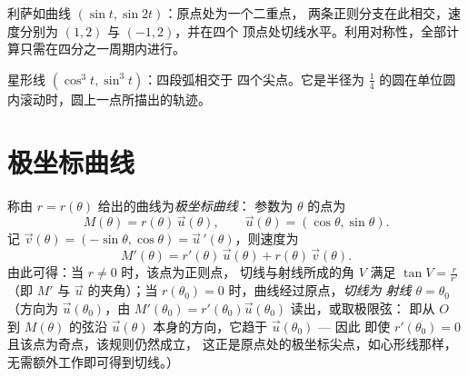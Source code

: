 \begin{omfigure}

{\small 利萨如曲线 $(\sin t, \sin 2t)$：原点处为一个二重点，
两条正则分支在此相交，速度分别为
$(1, 2)$ 与 $(-1, 2)$，并在四个
顶点处切线水平。利用对称性，全部计算只需在四分之一周期内进行。}
\end{omfigure}

\begin{omfigure}

{\small 星形线 $(\cos^3 t, \sin^3 t)$：四段弧相交于
四个尖点。它是半径为
$\frac14$ 的圆在单位圆内滚动时，圆上一点所描出的轨迹。}
\end{omfigure}

\section{极坐标曲线}

\begin{definition}\label{def:b1:curves:polar}
称由 $r = r(\theta)$ 给出的曲线为\emph{极坐标曲线}：
参数为 $\theta$ 的点为
\[
M(\theta) = r(\theta)\,\vec u(\theta),
\qquad \vec u(\theta) = (\cos\theta, \sin\theta).
\]
记 $\vec v(\theta) = (-\sin\theta, \cos\theta) = \vec
u\,'(\theta)$，则速度为
\[
M'(\theta) = r'(\theta)\, \vec u(\theta) + r(\theta)\, \vec
v(\theta) .
\]
由此可得：当 $r \neq 0$ 时，该点为正则点，
切线与射线所成的角 $V$ 满足 $\tan V =
\frac{r}{r'}$（即 $M'$ 与 $\vec u$ 的夹角）；当 $r(\theta_0)
= 0$ 时，曲线经过原点，\emph{切线为
射线 $\theta = \theta_0$}（方向为 $\vec u(\theta_0)$，由
$M'(\theta_0) = r'(\theta_0)\vec u(\theta_0)$ 读出，或取极限弦：
即从 $O$ 到 $M(\theta)$ 的弦沿 $\vec
u(\theta)$ 本身的方向，它趋于 $\vec u(\theta_0)$ --- 因此
即使 $r'(\theta_0) = 0$ 且该点为奇点，该规则仍然成立，
这正是原点处的极坐标尖点，如心形线那样，
无需额外工作即可得到切线。）
\end{definition}

